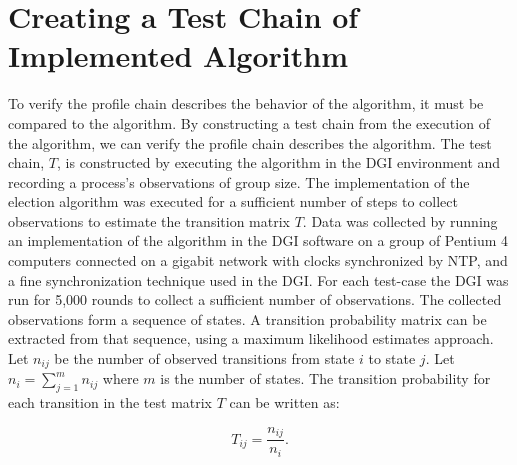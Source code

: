 
\section{Creating a Test Chain of Implemented Algorithm}

To verify the profile chain describes the behavior of the algorithm, it must be compared to the algorithm.
By constructing a test chain from the execution of the algorithm, we can verify the profile chain describes the algorithm.
The test chain, $T$, is constructed by executing the algorithm in the DGI environment and recording a process's observations of group size.
The implementation of the election algorithm was executed for a sufficient number of steps to collect observations to estimate the transition matrix $T$.
Data was collected by running an implementation of the algorithm in the DGI software on a group of Pentium 4 computers connected on a gigabit network with clocks synchronized by NTP, and a fine synchronization technique used in the DGI.
For each test-case the DGI was run for 5,000 rounds to collect a sufficient number of observations.
The collected observations form a sequence of states.
A transition probability matrix can be extracted from that sequence, using a maximum likelihood estimates approach.
Let $n_{ij}$ be the number of observed transitions from state $i$ to state $j$. Let $n_{i}=\sum_{j=1}^{m} n_{ij}$ where $m$ is the number of states.
The transition probability for each transition in the test matrix $T$ can be written as:

\begin{equation} T_{ij} = \frac{n_{ij}}{n_{i}}. \end{equation}
